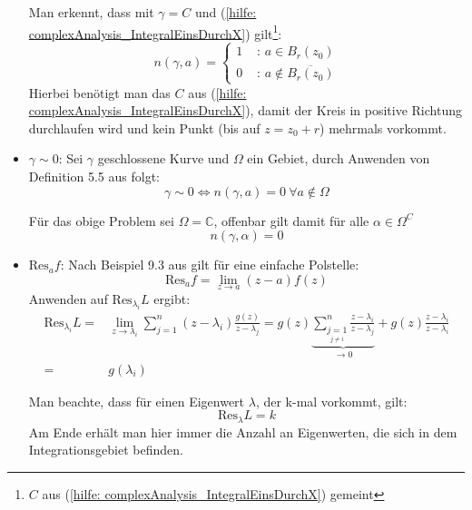 \documentclass[a4paper,12pt]{report}
\newcommand{\C}{\mathbb C}
\newcommand{\1}{\mathds{1}}
\newcommand{\Res}{\text{Res}}
\theoremstyle{plain} %
\theoremstyle{definition} %
\theoremstyle{remark}
\begin{document}
\begin{itemize}
                        Man erkennt, dass mit $\gamma = C$  und (\ref{hilfe: complexAnalysis_IntegralEinsDurchX}) gilt\footnote{$C$ aus (\ref{hilfe: complexAnalysis_IntegralEinsDurchX}) gemeint}:
                        \begin{equation}
                              \label{hilfe: complexAnalysis_WindungNullEins}
                              n(\gamma,a) = \begin{cases}
                                    1& \text{ : }a\in B_r(z_0)\\
                                    0& \text{ : }a\notin\overline {B_r(z_0)}
                              \end{cases}
                        \end{equation}
                        Hierbei benötigt man das $C$ aus (\ref{hilfe: complexAnalysis_IntegralEinsDurchX}), damit der Kreis in positive Richtung durchlaufen wird und kein Punkt (bis auf $z=z_0+r$) mehrmals vorkommt.
                  \item $\gamma \sim 0$:
                        Sei $\gamma$ geschlossene Kurve und $\Omega$ ein Gebiet, durch Anwenden von Definition 5.5 aus \cite[S. 67]{complexAnalysis} folgt:
                        $$\gamma \sim 0 \Leftrightarrow n(\gamma, a)=0\ \forall a\notin \Omega$$

                        Für das obige Problem sei $\Omega = \C$, offenbar gilt damit für alle $\alpha \in \Omega^C$
                        $$n(\gamma, \alpha) = 0$$

                  \item $\Res_af$:
                        Nach Beispiel 9.3 aus \cite[S. 142]{complexAnalysis} gilt für eine einfache Polstelle:
                        \begin{equation}
                              \label{hilfe: complexAnalysis_Residuum}
                              \Res_af = \lim_{z\to a} (z-a)f(z)
                        \end{equation}
                        Anwenden auf $\Res_{\lambda_i}L$ ergibt:
                        \begin{align*}
                              \Res_{\lambda_i}L =& \lim_{z\to \lambda_i} \sum_{j=1}^{n} (z-\lambda_i)\frac{g(z)}{z-\lambda_j} = g(z)\underbrace{\sum_{\underset{j\ne i}{j=1}}^{n} \frac{z-\lambda_i}{z-\lambda_j}}_{\to 0} + g(z)\frac{z-\lambda_i}{z-\lambda_i} \\
                              =& g(\lambda_i)
                        \end{align*}

                        Man beachte, dass für einen Eigenwert $\lambda$, der k-mal vorkommt, gilt:
                        $$\Res_\lambda L = k$$
                        Am Ende erhält man hier immer die Anzahl an Eigenwerten, die sich in dem Integrationsgebiet befinden.
            \end{itemize}
\end{document}
